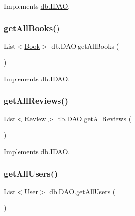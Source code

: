 Implements \hyperlink{interfacedb_1_1_i_d_a_o_a78ca80bc2f2b660edeb9eddd8ca9a4b7}{db.\+I\+D\+AO}.

\mbox{\label{classdb_1_1_d_a_o_a82a8c60ccd0de2f70b69bc36d29aeef8}} 
\subsubsection{\texorpdfstring{get\+All\+Books()}{getAllBooks()}}
{\footnotesize\ttfamily List$<$\hyperlink{classserver_1_1data_1_1_book}{Book}$>$ db.\+D\+A\+O.\+get\+All\+Books (\begin{DoxyParamCaption}{ }\end{DoxyParamCaption})}



Implements \hyperlink{interfacedb_1_1_i_d_a_o_a75a5ebcd7c3421ae7cccc8e2f3b2d9f9}{db.\+I\+D\+AO}.

\mbox{\label{classdb_1_1_d_a_o_a4df79c7d44b050aa55451db2ecf342f6}} 
\subsubsection{\texorpdfstring{get\+All\+Reviews()}{getAllReviews()}}
{\footnotesize\ttfamily List$<$\hyperlink{classserver_1_1data_1_1_review}{Review}$>$ db.\+D\+A\+O.\+get\+All\+Reviews (\begin{DoxyParamCaption}{ }\end{DoxyParamCaption})}



Implements \hyperlink{interfacedb_1_1_i_d_a_o_a3d9625d7e5426aad3c2e70fd0174e5f0}{db.\+I\+D\+AO}.

\mbox{\label{classdb_1_1_d_a_o_a3b627b7177990799fd02e0c38b8adb70}} 
\subsubsection{\texorpdfstring{get\+All\+Users()}{getAllUsers()}}
{\footnotesize\ttfamily List$<$\hyperlink{classserver_1_1data_1_1_user}{User}$>$ db.\+D\+A\+O.\+get\+All\+Users (\begin{DoxyParamCaption}{ }\end{DoxyParamCaption})}



